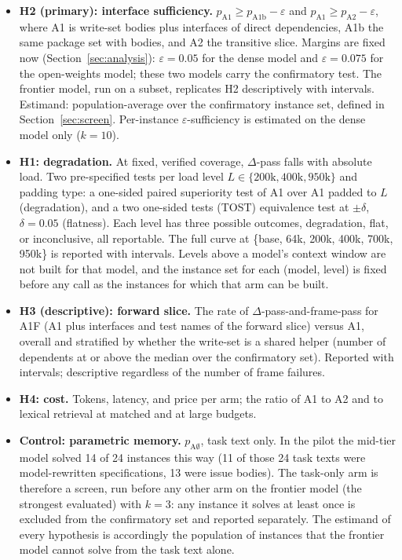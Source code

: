 \documentclass[10pt,conference]{IEEEtran}
\newcommand{\eps}{\varepsilon}
\begin{document}
\begin{itemize}
\item \textbf{H2 (primary): interface sufficiency.} $p_{\mathrm{A1}} \ge p_{\mathrm{A1b}} - \eps$ and $p_{\mathrm{A1}} \ge p_{\mathrm{A2}} - \eps$, where A1 is write-set bodies plus interfaces of direct dependencies, A1b the same package set with bodies, and A2 the transitive slice. Margins are fixed now (Section~\ref{sec:analysis}): $\eps = 0.05$ for the dense model and $\eps = 0.075$ for the open-weights model; these two models carry the confirmatory test. The frontier model, run on a subset, replicates H2 descriptively with intervals. Estimand: population-average over the confirmatory instance set, defined in Section~\ref{sec:screen}. Per-instance $\eps$-sufficiency is estimated on the dense model only ($k=10$).
\item \textbf{H1: degradation.} At fixed, verified coverage, $\Delta$-pass falls with absolute load. Two pre-specified tests per load level $L \in \{200\mathrm{k}, 400\mathrm{k}, 950\mathrm{k}\}$ and padding type: a one-sided paired superiority test of A1 over A1 padded to $L$ (degradation), and a two one-sided tests (TOST) equivalence test at $\pm\delta$, $\delta = 0.05$ (flatness). Each level has three possible outcomes, degradation, flat, or inconclusive, all reportable. The full curve at \{base, 64k, 200k, 400k, 700k, 950k\} is reported with intervals. Levels above a model's context window are not built for that model, and the instance set for each (model, level) is fixed before any call as the instances for which that arm can be built.
\item \textbf{H3 (descriptive): forward slice.} The rate of $\Delta$-pass-and-frame-pass for A1F (A1 plus interfaces and test names of the forward slice) versus A1, overall and stratified by whether the write-set is a shared helper (number of dependents at or above the median over the confirmatory set). Reported with intervals; descriptive regardless of the number of frame failures.
\item \textbf{H4: cost.} Tokens, latency, and price per arm; the ratio of A1 to A2 and to lexical retrieval at matched and at large budgets.
\item \textbf{Control: parametric memory.} $p_{\mathrm{A\emptyset}}$, task text only. In the pilot the mid-tier model solved 14 of 24 instances this way (11 of those 24 task texts were model-rewritten specifications, 13 were issue bodies). The task-only arm is therefore a screen, run before any other arm on the frontier model (the strongest evaluated) with $k=3$: any instance it solves at least once is excluded from the confirmatory set and reported separately. The estimand of every hypothesis is accordingly the population of instances that the frontier model cannot solve from the task text alone.
\end{itemize}
\end{document}
